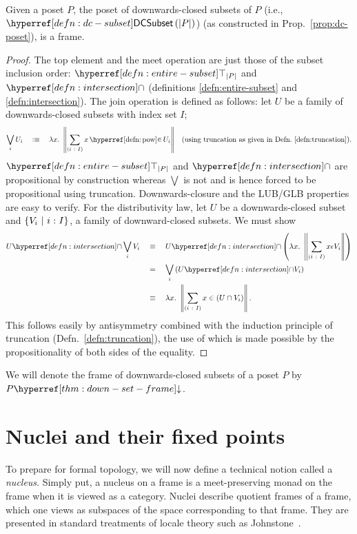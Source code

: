 \begin{thm}\label{thm:down-set-frame}
  Given a poset $P$, the poset of downwards-closed subsets of $P$ (i.e.,
  $\dcsubset{\abs{P}}$) (as constructed in Prop.~\ref{prop:dc-poset}), is a frame.
\end{thm}
\begin{proof}
  The top element and the meet operation are just those of the subset inclusion order:
  $\entire{\abs{P}}$ and $\intersectnm{}$ (definitions \ref{defn:entire-subset} and
  \ref{defn:intersection}). The join operation is defined as follows: let $U$ be a family
  of downwards-closed subsets with index set $I$;
  \begin{align*}
    \bigvee_i U_i \quad\is\quad \lambda x.~ \trunc{\sigmaty{i}{I}{\mempow{x}{U_i}}}
      && \text{(using truncation as given in Defn.~\ref{defn:truncation})}.
  \end{align*}
  $\entire{\abs{P}}$ and $\intersectnm{}$ are propositional by construction whereas $\bigvee$ is
  not and is hence forced to be propositional using truncation. Downwards-closure and the
  LUB/GLB properties are easy to verify. For the distributivity law, let $U$ be a
  downwards-closed subset and $\left\{  V_i ~|~ i\hspace{0.1mm}:\hspace{0.1mm}I  \right\}$, a family of
  downward-closed subsets. We must show
  \begin{align*}
    \intersect{U}{\bigvee_i V_i}
      \quad&\equiv\quad \intersect{U}{\left(\lambda x.~ \trunc{\sigmaty{i}{I}{x \epsilon V_i}}\right)}\\
      \quad&=\quad \bigvee_i \left(\intersect{U}{V_i} \right)\\
      \quad&\equiv\quad \lambda x.~ \trunc{\sigmaty{i}{I}{x \in (U \cap V_i)}}.
  \end{align*}
  This follows easily by antisymmetry combined with the induction principle of truncation
  (Defn.~\ref{defn:truncation}), the use of which is made possible by the propositionality
  of both sides of the equality.
\end{proof}

We will denote the frame of downwards-closed subsets of a poset $P$ by $\dcframe{P}$.

\section{Nuclei and their fixed points}\label{sec:nuclei}

To prepare for formal topology, we will now define a technical notion called a
\emph{nucleus}. Simply put, a nucleus on a frame is a meet-preserving monad on the frame
when it is viewed as a category. Nuclei describe quotient frames of a frame, which one
views as subspaces of the space corresponding to that frame. They are presented in
standard treatments of locale theory such as Johnstone~\cite[Sec.~II.2]{stone-spaces}.

